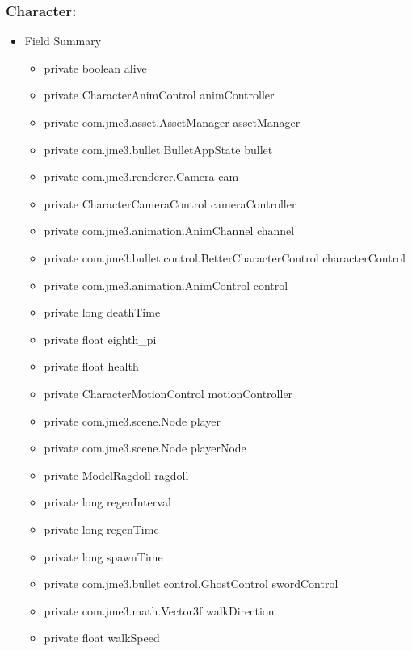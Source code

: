\documentclass[letterpaper]{article}
\begin{document}
				\vspace{0.2in}
				\subsubsection*{Character:}
				\vspace{0.1in}
					\begin{itemize}
						\item	Field Summary
								\begin{itemize}
									\item	private boolean	alive 
									\item	private CharacterAnimControl	animController 
									\item	private com.jme3.asset.AssetManager	assetManager 
									\item	private com.jme3.bullet.BulletAppState	bullet 
									\item	private com.jme3.renderer.Camera	cam 
									\item	private CharacterCameraControl	cameraController 
									\item	private com.jme3.animation.AnimChannel	channel 
									\item	private com.jme3.bullet.control.BetterCharacterControl	characterControl 
									\item	private com.jme3.animation.AnimControl	control 
									\item	private long	deathTime 
									\item	private float	eighth\_pi 
									\item	private float	health 
									\item	private CharacterMotionControl	motionController 
									\item	private com.jme3.scene.Node	player 
									\item	private com.jme3.scene.Node	playerNode 
									\item	private ModelRagdoll	ragdoll 
									\item	private long	regenInterval 
									\item	private long	regenTime 
									\item	private long	spawnTime 
									\item	private com.jme3.bullet.control.GhostControl	swordControl 
									\item	private com.jme3.math.Vector3f	walkDirection 
									\item	private float	walkSpeed 

\end{itemize}
\end{itemize}
\end{document}
